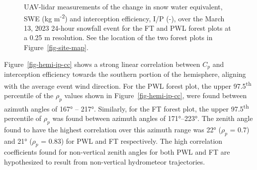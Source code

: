 \documentclass[
  letterpaper,
  DIV=11,
  numbers=noendperiod]{scrartcl}
\begin{document}
\begin{figure}[H]


\caption{\label{fig-lidar-tf-ip}UAV-lidar measurements of the change in
snow water equivalent, SWE (kg m\textsuperscript{-2}) and interception
efficiency, I/P (-), over the March 13, 2023 24-hour snowfall event for
the FT and PWL forest plots at a 0.25 m resolution. See the location of
the two forest plots in Figure~\ref{fig-site-map}.}

\end{figure}%

Figure~\ref{fig-hemi-ip-cc} shows a strong linear correlation between
\(C_p\) and interception efficiency towards the southern portion of the
hemisphere, aligning with the average event wind direction. For the PWL
forest plot, the upper 97.5\textsuperscript{th} percentile of the
\(\rho_p\) values shown in Figure~\ref{fig-hemi-ip-cc}, were found
between azimuth angles of 167° -- 217°. Similarly, for the FT forest
plot, the upper 97.5\textsuperscript{th} percentile of \(\rho_p\) was
found between azimuth angles of 171°--223°. The zenith angle found to
have the highest correlation over this azimuth range was 22° (\(\rho_p\)
= 0.7) and 21° (\(\rho_p\) = 0.83) for PWL and FT respectively. The high
correlation coefficients found for non-vertical zenith angles for both
PWL and FT are hypothesized to result from non-vertical hydrometeor
trajectories.
\end{document}

